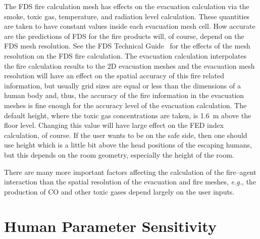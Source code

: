 \documentclass[12pt,a4paper,final,twoside]{stylevk}
\begin{document}
The FDS fire calculation mesh has effects on the evacuation
calculation via the smoke, toxic gas, temperature, and radiation level
calculation.  These quantities are taken to have constant values
inside each evacuation mesh cell.  How accurate are the predictions of
FDS for the fire products will, of course, depend on the FDS mesh
resolution.  See the FDS Technical Guide~\cite{FDS_Manual,
  FDS_VVGuide1, FDS_VVGuide2} for the effects of the mesh resolution
on the FDS fire calculation.  The evacuation calculation interpolates
the fire calculation results to the 2D evacuation meshes and the
evacuation mesh resolution will have an effect on the spatial accuracy
of this fire related information, but usually grid sizes are equal or
less than the dimensions of a human body and, thus, the accuracy of
the fire information in the evacuation meshes is fine enough for the
accuracy level of the evacuation calculation.  The default height,
where the toxic gas concentrations are taken, is 1.6~m above the floor
level.  Changing this value will have large effect on the FED index
calculation, of course.  If the user wants to be on the safe side,
then one should use height which is a little bit above the head
positions of the escaping humans, but this depends on the room
geometry, especially the height of the room.


There are many more important factors affecting the calculation of the
fire--agent interaction than the spatial resolution of the evacuation
and fire meshes, \emph{e.g.}, the production of CO and other toxic
gases depend largely on the user inputs.


\section{Human Parameter Sensitivity}\label{Sec_HumParSensi}
\end{document}
